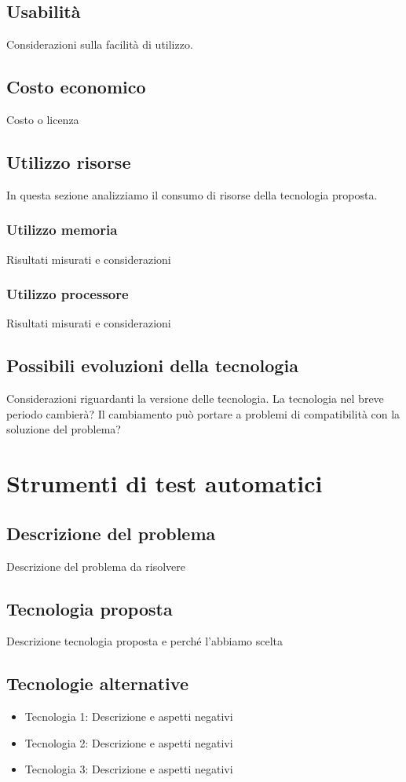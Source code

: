 \documentclass[./../Technology Baseline.tex]{subfiles}
\begin{document}
\subsection{Usabilità}
Considerazioni sulla facilità di utilizzo.
\subsection{Costo economico}
Costo o licenza
\subsection{Utilizzo risorse}
In questa sezione analizziamo il consumo di risorse della tecnologia proposta.
\subsubsection{Utilizzo memoria}
Risultati misurati e considerazioni
\subsubsection{Utilizzo processore}
Risultati misurati e considerazioni
\subsection{Possibili evoluzioni della tecnologia}
Considerazioni riguardanti la versione delle tecnologia.
La tecnologia nel breve periodo cambierà? Il cambiamento può portare a problemi di compatibilità con la soluzione del problema?

\section{Strumenti di test automatici}

\subsection{Descrizione del problema}
Descrizione del problema da risolvere

\subsection{Tecnologia proposta}
Descrizione tecnologia proposta e perché l'abbiamo scelta

\subsection{Tecnologie alternative}
\begin{itemize}
	\item{Tecnologia 1:} Descrizione e aspetti negativi
	\item{Tecnologia 2:} Descrizione e aspetti negativi
	\item{Tecnologia 3:} Descrizione e aspetti negativi
\end{itemize}
\end{document}
